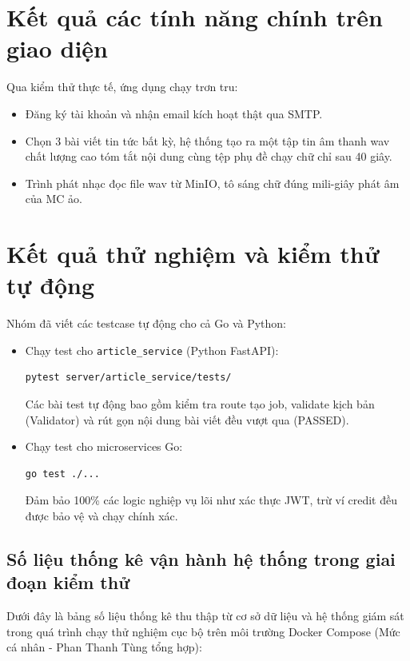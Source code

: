 \documentclass[12pt,a4paper]{report}
\begin{document}
\section{Kết quả các tính năng chính trên giao diện}
Qua kiểm thử thực tế, ứng dụng chạy trơn tru:
\begin{itemize}
    \item Đăng ký tài khoản và nhận email kích hoạt thật qua SMTP.
    \item Chọn 3 bài viết tin tức bất kỳ, hệ thống tạo ra một tập tin âm thanh wav chất lượng cao tóm tắt nội dung cùng tệp phụ đề chạy chữ chỉ sau 40 giây.
    \item Trình phát nhạc đọc file wav từ MinIO, tô sáng chữ đúng mili-giây phát âm của MC ảo.
\end{itemize}

\section{Kết quả thử nghiệm và kiểm thử tự động}
Nhóm đã viết các testcase tự động cho cả Go và Python:
\begin{itemize}
    \item Chạy test cho \texttt{article\_service} (Python FastAPI):
    \begin{lstlisting}[language=bash]
pytest server/article_service/tests/
    \end{lstlisting}
    Các bài test tự động bao gồm kiểm tra route tạo job, validate kịch bản (Validator) và rút gọn nội dung bài viết đều vượt qua (PASSED).
    \item Chạy test cho microservices Go:
    \begin{lstlisting}[language=bash]
go test ./...
    \end{lstlisting}
    Đảm bảo 100\% các logic nghiệp vụ lõi như xác thực JWT, trừ ví credit đều được bảo vệ và chạy chính xác.
\end{itemize}

\subsection{Số liệu thống kê vận hành hệ thống trong giai đoạn kiểm thử}
Dưới đây là bảng số liệu thống kê thu thập từ cơ sở dữ liệu và hệ thống giám sát trong quá trình chạy thử nghiệm cục bộ trên môi trường Docker Compose (Mức cá nhân - Phan Thanh Tùng tổng hợp):
\end{document}
